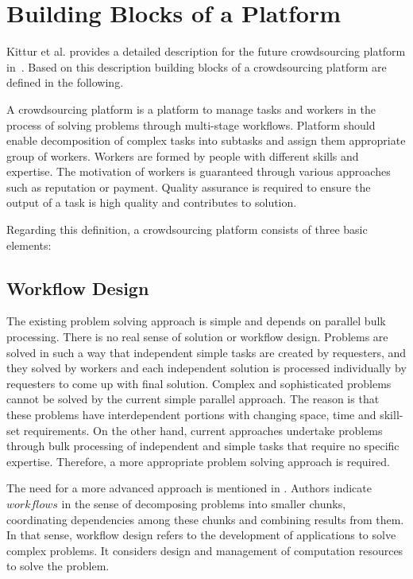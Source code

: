 \section{Building Blocks of a Platform}
Kittur et al. provides a detailed description for the future crowdsourcing platform 
in~\cite{Kittur2013}. Based on this description building blocks of a crowdsourcing 
platform are defined in the following.

A crowdsourcing platform is a platform to manage tasks and workers in the 
process of solving problems through multi-stage workflows. Platform should enable 
decomposition of complex tasks into subtasks and assign them appropriate group of 
workers. Workers are formed by people with different skills and expertise. The motivation 
of workers is guaranteed through various approaches 
such as reputation or payment. Quality assurance is required to ensure the output 
of a task is high quality and contributes to solution.

Regarding this definition, a crowdsourcing platform consists of three basic elements:

\subsection{Workflow Design}
The existing problem solving approach is simple and depends on parallel bulk 
processing. There is no real sense of solution or workflow design. Problems are 
solved in such a way that independent simple tasks are created by requesters, 
and they solved by workers and each independent solution is processed 
individually by requesters to come up with final solution. Complex and 
sophisticated problems cannot be solved by the current simple parallel 
approach. The reason is that these problems have interdependent portions with 
changing space, time and skill-set requirements. On the other hand, current 
approaches undertake problems through bulk processing of independent 
and simple tasks that require no specific expertise. Therefore, a more appropriate 
problem solving approach is required.

The need for a more advanced approach is mentioned in \cite{Kittur2013}. Authors 
indicate $workflows$ in the sense of decomposing problems into smaller chunks, 
coordinating dependencies among these chunks and combining results from them. 
In that sense, workflow design refers to the development of applications to solve 
complex problems. It considers design and management of computation resources 
to solve the problem.

